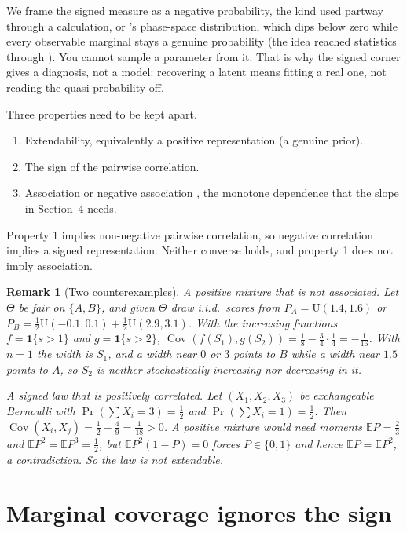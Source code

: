 \documentclass[11pt]{article}
\newtheorem{remark}{Remark}
\begin{document}
We frame the signed measure as a negative probability, the kind \citet{feynman1987} used
partway through a calculation, or \citet{wigner1932}'s phase-space distribution, which dips
below zero while every observable marginal stays a genuine probability (the idea reached
statistics through \citealp{bartlett1945}). You cannot sample a parameter from it. That is why
the signed corner gives a diagnosis, not a model: recovering a latent means fitting a real one,
not reading the quasi-probability off.

Three properties need to be kept apart.
\begin{enumerate}
\item Extendability, equivalently a positive representation (a genuine prior).
\item The sign of the pairwise correlation.
\item Association or negative association \citep{esary1967,joagdev1983}, the monotone dependence
that the slope in Section~4 needs.
\end{enumerate}
Property 1 implies non-negative pairwise correlation, so negative correlation implies a signed
representation. Neither converse holds, and property 1 does not imply association.

\begin{remark}[Two counterexamples]\label{rem:counter}
\emph{A positive mixture that is not associated.} Let $\Theta$ be fair on $\{A,B\}$, and given
$\Theta$ draw i.i.d.\ scores from $P_A=\mathrm{U}(1.4,1.6)$ or
$P_B=\tfrac12\mathrm{U}(-0.1,0.1)+\tfrac12\mathrm{U}(2.9,3.1)$. With the increasing functions
$f=\mathbf 1\{s>1\}$ and $g=\mathbf 1\{s>2\}$,
$\operatorname{Cov}(f(S_1),g(S_2))=\tfrac18-\tfrac34\cdot\tfrac14=-\tfrac1{16}$. With $n=1$ the
width is $S_1$, and a width near $0$ or $3$ points to $B$ while a width near $1.5$ points to $A$, so
$S_2$ is neither stochastically increasing nor decreasing in it.

\emph{A signed law that is positively correlated.} Let $(X_1,X_2,X_3)$ be exchangeable Bernoulli
with $\Pr(\sum X_i=3)=\tfrac12$ and $\Pr(\sum X_i=1)=\tfrac12$. Then
$\operatorname{Cov}(X_i,X_j)=\tfrac12-\tfrac49=\tfrac1{18}>0$. A positive mixture would need
moments $\mathbb E P=\tfrac23$ and $\mathbb E P^2=\mathbb E P^3=\tfrac12$, but $\mathbb E P^2(1-P)=0$ forces $P\in\{0,1\}$
and hence $\mathbb E P=\mathbb E P^2$, a contradiction. So the law is not extendable.
\end{remark}

\section{Marginal coverage ignores the sign}
\end{document}
